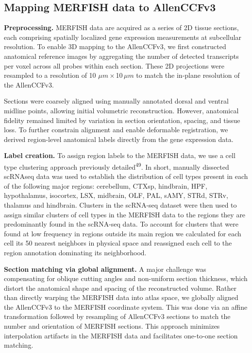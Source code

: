 \documentclass[
  12pt,
]{article}
\begin{document}
\subsection{Mapping MERFISH data to
AllenCCFv3}\label{mapping-merfish-data-to-allenccfv3}

\textbf{Preprocessing.} MERFISH data are acquired as a series of 2D
tissue sections, each comprising spatially localized gene expression
measurements at subcellular resolution. To enable 3D mapping to the
AllenCCFv3, we first constructed anatomical reference images by
aggregating the number of detected transcripts per voxel across all
probes within each section. These 2D projections were resampled to a
resolution of 10 \(\mu m\)\,\(\times\)\,10\,\(\mu m\) to match the
in-plane resolution of the AllenCCFv3.

Sections were coarsely aligned using manually annotated dorsal and
ventral midline points, allowing initial volumetric reconstruction.
However, anatomical fidelity remained limited by variation in section
orientation, spacing, and tissue loss. To further constrain alignment
and enable deformable registration, we derived region-level anatomical
labels directly from the gene expression data.

\textbf{Label creation.} To assign region labels to the MERFISH data, we
use a cell type clustering approach previously
detailed\textsuperscript{49}. In short, manually dissected scRNAseq data
was used to establish the distribution of cell types present in each of
the following major regions: cerebellum, CTXsp, hindbrain, HPF,
hypothalamus, isocortex, LSX, midbrain, OLF, PAL, sAMY, STRd, STRv,
thalamus and hindbrain. Clusters in the scRNA-seq dataset were then used
to assign similar clusters of cell types in the MERFISH data to the
regions they are predominantly found in the scRNA-seq data. To account
for clusters that were found at low frequency in regions outside its
main region we calculated for each cell its 50 nearest neighbors in
physical space and reassigned each cell to the region annotation
dominating its neighborhood.

\textbf{Section matching via global alignment.} A major challenge was
compensating for oblique cutting angles and non-uniform section
thickness, which distort the anatomical shape and spacing of the
reconstructed volume. Rather than directly warping the MERFISH data into
atlas space, we globally aligned the AllenCCFv3 to the MERFISH
coordinate system. This was done via an affine transformation followed
by resampling of AllenCCFv3 sections to match the number and orientation
of MERFISH sections. This approach minimizes interpolation artifacts in
the MERFISH data and facilitates one-to-one section matching.
\end{document}
